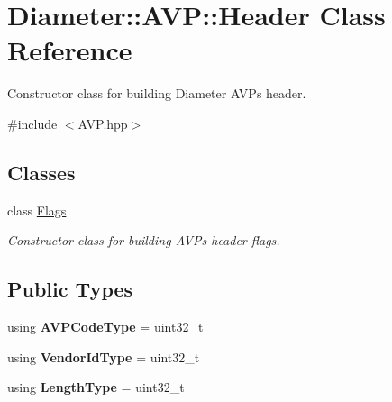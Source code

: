 \hypertarget{classDiameter_1_1AVP_1_1Header}{}\section{Diameter\+:\+:A\+VP\+:\+:Header Class Reference}
\label{classDiameter_1_1AVP_1_1Header}


Constructor class for building Diameter A\+V\+Ps header.  




{\ttfamily \#include $<$A\+V\+P.\+hpp$>$}

\subsection*{Classes}
\begin{DoxyCompactItemize}
\item 
class \hyperlink{classDiameter_1_1AVP_1_1Header_1_1Flags}{Flags}
\begin{DoxyCompactList}\small\item\em Constructor class for building A\+V\+Ps header flags. \end{DoxyCompactList}\end{DoxyCompactItemize}
\subsection*{Public Types}
\begin{DoxyCompactItemize}
\item 
\mbox{\label{classDiameter_1_1AVP_1_1Header_a376736aad210069e41752c199492d52e}} 
using {\bfseries A\+V\+P\+Code\+Type} = uint32\+\_\+t
\item 
\mbox{\label{classDiameter_1_1AVP_1_1Header_aca7a93fe1893b5ad6a778957e28a0e18}} 
using {\bfseries Vendor\+Id\+Type} = uint32\+\_\+t
\item 
\mbox{\label{classDiameter_1_1AVP_1_1Header_a76971d359a15e156b6c663cf0d9f4ff7}} 
using {\bfseries Length\+Type} = uint32\+\_\+t
\end{DoxyCompactItemize}
